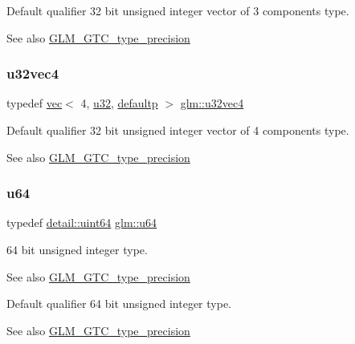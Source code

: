 Default qualifier 32 bit unsigned integer vector of 3 components type. \begin{DoxySeeAlso}{See also}
\hyperlink{group__gtc__type__precision}{G\+L\+M\+\_\+\+G\+T\+C\+\_\+type\+\_\+precision} 
\end{DoxySeeAlso}
\mbox{\label{group__gtc__type__precision_gad3f72b91c5b7efbc377625c44433824d}} 
\subsubsection{\texorpdfstring{u32vec4}{u32vec4}}
{\footnotesize\ttfamily typedef \hyperlink{structglm_1_1vec}{vec}$<$ 4, \hyperlink{group__gtc__type__precision_ga54e837745059fd29017bed71cfa0a8db}{u32}, \hyperlink{namespaceglm_a36ed105b07c7746804d7fdc7cc90ff25a9d21ccd8b5a009ec7eb7677befc3bf51}{defaultp} $>$ \hyperlink{group__gtc__type__precision_gad3f72b91c5b7efbc377625c44433824d}{glm\+::u32vec4}}

Default qualifier 32 bit unsigned integer vector of 4 components type. \begin{DoxySeeAlso}{See also}
\hyperlink{group__gtc__type__precision}{G\+L\+M\+\_\+\+G\+T\+C\+\_\+type\+\_\+precision} 
\end{DoxySeeAlso}
\mbox{\label{group__gtc__type__precision_ga71cedd4972f9cb1a5e14dfe5ab83ecd7}} 
\subsubsection{\texorpdfstring{u64}{u64}}
{\footnotesize\ttfamily typedef \hyperlink{namespaceglm_1_1detail_adec4b19bf4982125e122db2fe03c5810}{detail\+::uint64} \hyperlink{group__gtc__type__precision_ga71cedd4972f9cb1a5e14dfe5ab83ecd7}{glm\+::u64}}

64 bit unsigned integer type. \begin{DoxySeeAlso}{See also}
\hyperlink{group__gtc__type__precision}{G\+L\+M\+\_\+\+G\+T\+C\+\_\+type\+\_\+precision}
\end{DoxySeeAlso}
Default qualifier 64 bit unsigned integer type. \begin{DoxySeeAlso}{See also}
\hyperlink{group__gtc__type__precision}{G\+L\+M\+\_\+\+G\+T\+C\+\_\+type\+\_\+precision} 
\end{DoxySeeAlso}
\mbox{\label{group__gtc__type__precision_gaf01aa7972f78cabc61558a0171d78a01}} 

